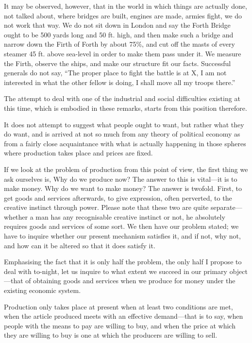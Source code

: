 \documentclass{book}
\begin{document}
It may be observed, however, that in the world in which things are actually done, not talked about, where bridges are built, engines are made, armies fight, we do not work that way. We do not sit down in London and say the Forth Bridge ought to be 500 yards long and 50 ft. high, and then make such a bridge and narrow down the Firth of Forth by about 75\%, and cut off the masts of every steamer 45 ft. above sea-level in order to make them pass under it. We measure the Firth, observe the ships, and make our structure fit our facts. Successful generals do not say, “The proper place to fight the battle is at X, I am not interested in what the other fellow is doing, I shall move all my troops there.”

The attempt to deal with one of the industrial and social difficulties existing at this time, which is embodied in these remarks, starts from this position therefore.

It does not attempt to suggest what people ought to want, but rather what they do want, and is arrived at not so much from any theory of political economy as from a fairly close acquaintance with what is actually happening in those spheres where production takes place and prices are fixed.

If we look at the problem of production from this point of view, the first thing we ask ourselves is, Why do we produce now? The answer to this is vital—it is to make money. Why do we want to make money? The answer is twofold. First, to get goods and services afterwards, to give expression, often perverted, to the creative instinct through power. Please note that these two are quite separate—whether a man has any recognisable creative instinct or not, he absolutely requires goods and services of some sort. We then have our problem stated; we have to inquire whether our present mechanism satisfies it, and if not, why not, and how can it be altered so that it does satisfy it.

Emphasising the fact that it is only half the problem, the only half I propose to deal with to-night, let us inquire to what extent we succeed in our primary object—that of obtaining goods and services when we produce for money under the existing economic system.

Production only takes place at present when at least two conditions are met, when the article produced meets with an effective demand—that is to say, when people with the means to pay are willing to buy, and when the price at which they are willing to buy is one at which the producers are willing to sell.
\end{document}
